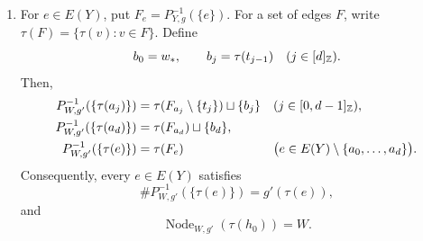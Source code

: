\begin{lemma}
\begin{enumerate}
\item\label{c:insert-chain-fibers} For $e\in E(Y)$, put $F_e=P_{Y,g}^{-1}(\{e\})$. For a set of edges $F$, write $\tau(F)=\{\tau(v):v\in F\}$. Define
\[
b_0=w_*,\qquad b_j=\tau(t_{j-1})\quad(j\in[d]_{\mathbb Z}).
\]
Then, \begin{equation}\label{eq:insertion-chain-fibers}
\begin{aligned}
P_{W,g'}^{-1}(\{\tau(a_j)\})
   &=\tau(F_{a_j}\setminus\{t_j\})\sqcup\{b_j\}
     &&(j\in[0,d-1]_{\mathbb Z}),\\
P_{W,g'}^{-1}(\{\tau(a_d)\})
   &=\tau(F_{a_d})\sqcup\{b_d\},\\
P_{W,g'}^{-1}(\{\tau(e)\})
   &=\tau(F_e)
     &&\bigl(e\in E(Y)\setminus\{a_0,\ldots,a_d\}\bigr).
\end{aligned}
\end{equation}
Consequently, every $e\in E(Y)$ satisfies
\[
\#P_{W,g'}^{-1}(\{\tau(e)\})=g'(\tau(e)),
\]
and
\[
\operatorname{Node}_{W,g'}(\tau(h_0))=W.
\]
\end{enumerate}
\end{lemma}
